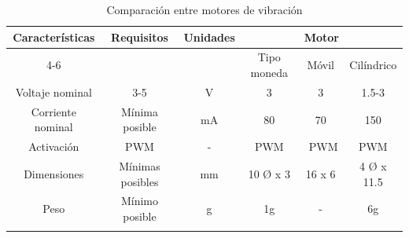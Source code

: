 \begin{table}[H]
\centering
\caption{Comparación entre motores de vibración}
\label{tab:4.Caracteristicas motor}
\begin{tabular}{|c|c|c||c|c|c|} 
\hline
\multirow{2}{*}{Características} & \multirow{2}{*}{Requisitos} & \multirow{2}{*}{Unidades} & \multicolumn{3}{c|}{Motor}         \\ 
\cline{4-6}
                                 &                             &                           & Tipo moneda & Móvil  & Cilíndrico  \\ 
\hhline{|===::===|}
Voltaje nominal                  & 3-5                         & V                         & 3           & 3      & 1.5-3       \\ 
\hline
Corriente nominal                & Mínima posible              & mA                        & 80          & 70     & 150         \\ 
\hline
Activación                       & PWM                         & -                         & PWM         & ~PWM   & PWM         \\ 
\hline
Dimensiones                      & Mínimas posibles            & mm                        & 10 Ø x 3    & 16 x 6 & 4 Ø x 11.5  \\ 
\hline
Peso                             & Mínimo posible              & g                         & 1g          & -      & 6g          \\
\arrayrulecolor{black}\hline
\end{tabular}
\end{table}


